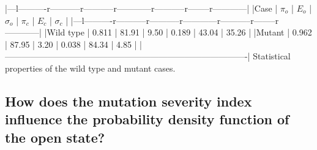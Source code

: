 |---l----------r-----------r-----------r------------r-----------r--------r------------|
|Case      | $\pi_{o}$ | $E_{o}$ | $\sigma_{o}$ | $\pi_{c}$ | $E_{c}$ | $\sigma_{c}$  |
|---l----------r-----------r-----------r------------r-----------r--------r------------|
|Wild type | 0.811     | 81.91   | 9.50         | 0.189     | 43.04   | 35.26         |
|Mutant    | 0.962     | 87.95   | 3.20         | 0.038     | 84.34   | 4.85          |
|-------------------------------------------------------------------------------------|
Statistical properties of the wild type and mutant cases.




\subsection{How does the mutation severity index influence the probability
density function of the open state?}

